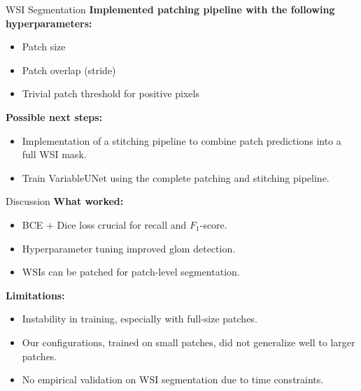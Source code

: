 \documentclass{beamer}
\begin{document}
\begin{frame}{WSI Segmentation}
    \textbf{Implemented patching pipeline with the following hyperparameters:}
    \begin{itemize}
        \item Patch size
        \item Patch overlap (stride)
        \item Trivial patch threshold for positive pixels
    \end{itemize}

    \vspace{0.5cm}

    \textbf{Possible next steps:}
    \begin{itemize}
        \item Implementation of a stitching pipeline to combine patch predictions into a full WSI mask.
        \item Train VariableUNet using the complete patching and stitching pipeline.
    \end{itemize}
\end{frame}

\begin{frame}{Discussion}
    \textbf{What worked:}
    \begin{itemize}
        \item BCE + Dice loss crucial for recall and $F_1$-score.
        \item Hyperparameter tuning improved glom detection.
        \item WSIs can be patched for patch-level segmentation.
    \end{itemize}

    \vspace{0.5cm}

    \textbf{Limitations:}
    \begin{itemize}
        \item Instability in training, especially with full-size patches.
        \item Our configurations, trained on small patches, did not generalize well to larger patches.
        \item No empirical validation on WSI segmentation due to time constraints.
    \end{itemize}
\end{frame}
\end{document}
